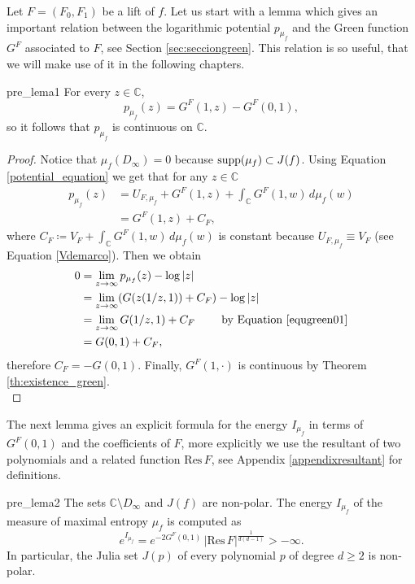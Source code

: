 Let $F=(F_0,F_1)$ be a lift of $f$. Let us start with a lemma which gives an important relation between the logarithmic potential $p_{\mu_f}$ and the Green function $G^F$ associated to $F$, see Section \ref{sec:secciongreen}. This relation is so useful, that we will make use of it in the following chapters.\\

\begin{mylema}{}{pre_lema1}
For every $z\in \mathbb{C}$,
\begin{equation}\label{relation_potential}
p_{\mu_f}(z) = G^F(1,z)-G^F(0,1),
\end{equation}
so it follows that $p_{\mu_f}$ is continuous on $\mathbb{C}$.
\end{mylema}

\begin{proof}
Notice that $\mu_f(D_\infty)=0$ because $\text{supp}(\mu_f) \subset J(f)$. Using Equation \eqref{potential_equation} we get that for any $z\in \mathbb{C}$
\begin{align*}
p_{\mu_f}(z) &= U_{F,\mu_f} + G^F(1,z) + \int_{\mathbb{C}}G^F(1,w) \,d\mu_f(w)\\
&= G^F(1,z)+C_F,
\end{align*}
where $C_F \coloneqq V_F + \int_{\mathbb{C}}G^F(1,w) \,d\mu_f(w)$ is constant because $U_{F,\mu_f} \equiv V_F$ (see Equation \ref{Vdemarco}). Then we obtain
\begin{align*}
0 &= \lim_{z\rightarrow \infty} p_{\mu_f}(z)-\log|z|\\
  &= \lim_{z\rightarrow \infty} (G(z(1/z,1))+C_F) - \log|z|\\
 &= \lim_{z\rightarrow \infty} G(1/z,1)+C_F \qquad \text{ by Equation \eqref{equgreen01}}\\
 &= G(0,1)+C_F,
\end{align*}
therefore $C_F=-G(0,1)$. Finally, $G^F(1,\cdot)$ is continuous by Theorem \ref{th:existence_green}.\\
\end{proof}

The next lemma gives an explicit formula for the energy $I_{\mu_f}$ in terms of $G^F(0,1)$ and the coefficients of $F$, more explicitly we use the resultant of two polynomials and a related function $\text{Res}\, F$, see Appendix \ref{appendixresultant} for definitions.\\

\begin{mylema}{}{pre_lema2}
The sets $\mathbb{C} \setminus D_\infty$ and $J(f)$ are non-polar. The energy $I_{\mu_f}$ of the measure of maximal entropy $\mu_f$ is computed as 
$$e^{I_{\mu_f}} = e^{-2G^F(0,1)} \,|\text{Res}\, F|^{\frac{1}{d(d-1)}}>-\infty.$$
In particular, the Julia set $J(p)$ of every polynomial $p$ of degree $d\geq 2$ is non-polar.
\end{mylema}

